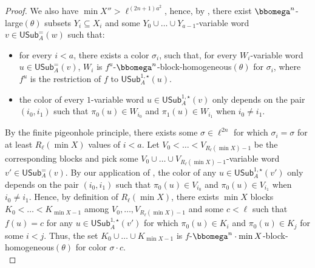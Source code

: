 \documentclass{article}
\numberwithin{theorem}{section}
\newcommand{\USub}{\mathsf{USub}}
\begin{document}
\begin{proof}
We also have $\min X'' >  \ell^{(2n+1)a^2}$, hence, by , there exist $\bbomega^{n}$-large$(\theta)$ subsets $Y_i \subseteq X_i$ and some $Y_0 \cup \dots \cup Y_{a - 1}$-variable word $v \in \USub^=_A(w)$ such that: 

\begin{itemize}
    \item[(1)] for every $i < a$, there exists a color $\sigma_i$, such that, for every $W_i$-variable word $u \in \USub_A^{=}(v)$, $W_i$ is $f^u$-$\bbomega^n$-block-homogeneous$(\theta)$ for $\sigma_i$, where $f^u$ is the restriction of $f$ to $\USub^{1,\star}_A(u)$.
    \item[(2)] the color of every $1$-variable word $u \in \USub_A^{1,\star}(v)$ only depends on the pair $(i_0,i_1)$ such that $\pi_0(u) \in W_{i_0}$ and $\pi_1(u) \in W_{i_1}$ when $i_0 \neq i_1$.
\end{itemize}





By the finite pigeonhole principle, there exists some $\sigma \in \ell^{2n}$ for which $\sigma_i = \sigma$ for at least $R_{\ell}(\min X)$ values of $i < a$. Let $V_{0} < \dots < V_{R_{\ell}(\min X) - 1}$ be the corresponding blocks and pick some $V_{0} \cup \dots \cup V_{R_{\ell}(\min X) - 1}$-variable word $v' \in \USub^=_A(v)$. By our application of , the color of any $u \in \USub_A^{1,\star}(v')$ only depends on the pair $(i_0, i_1)$ such that $\pi_0(u) \in V_{i_0}$ and $\pi_0(u) \in V_{i_1}$ when $i_0 \neq i_1$. Hence, by definition of $R_{\ell}(\min X)$, there exists $\min X$ blocks $K_0 < \dots < K_{\min X - 1}$ among $V_{0}, \dots, V_{R_{\ell}(\min X) - 1}$ and some $c < \ell$ such that $f(u) = c$ for any $u \in \USub_A^{1,\star}(v')$ for which $\pi_0(u) \in K_i$ and $\pi_0(u) \in K_j$ for some $i < j$. Thus, the set $K_0 \cup \dots \cup K_{\min X - 1}$ is $f$-$\bbomega^n\cdot \min X$-block-homogeneous$(\theta)$ for color $\sigma \cdot c$. \\


\end{proof}
\end{document}
